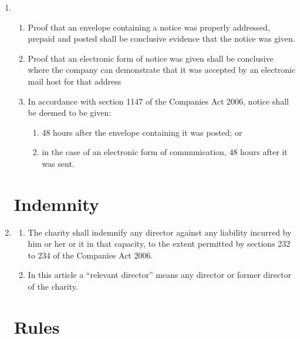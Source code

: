 \begin{enumerate}
\item
  \begin{enumerate}
  \item
    Proof that an envelope containing a notice was properly addressed,
    prepaid and posted shall be conclusive evidence that the notice was
    given.
  \item
    Proof that an electronic form of notice was given shall be
    conclusive where the company can demonstrate that it was
    accepted by an electronic mail host for that address
  \item
    In accordance with section 1147 of the Companies Act 2006, notice
    shall be deemed to be given:
    \begin{enumerate}
    \item
      48 hours after the envelope containing it was posted; or
    \item
      in the case of an electronic form of communication, 48 hours after
      it was sent.
    \end{enumerate}
  \end{enumerate}

\section{Indemnity}

\item \label{cls:directors-indemnity}
  \begin{enumerate}
  \item
    The charity shall indemnify any director against any
    liability incurred by him or her or it in that capacity, to the
    extent permitted by sections 232 to 234 of the Companies Act 2006.
  \item
    In this article a ``relevant director'' means any director or
    former director of the charity.
  \end{enumerate}

\section{Rules}


\end{enumerate}
